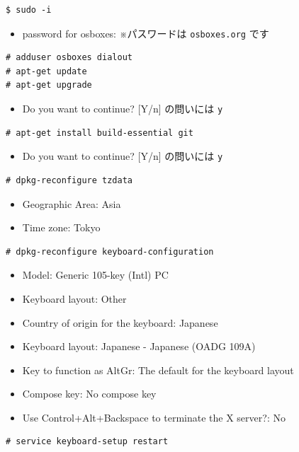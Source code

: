 \documentclass[a4j,oneside]{ujbook}
\begin{document}
\begin{verbatim}
$ sudo -i
\end{verbatim}
\begin{itemize}
 \renewcommand{\labelitemi}{$\triangleright$}
 \item password for osboxes: ※パスワードは \verb+osboxes.org+ です
\end{itemize}
\begin{verbatim}
# adduser osboxes dialout
# apt-get update
# apt-get upgrade
\end{verbatim}
\begin{itemize}
 \renewcommand{\labelitemi}{$\triangleright$}
 \item Do you want to continue? [Y/n] の問いには \verb+y+
\end{itemize}
\begin{verbatim}
# apt-get install build-essential git
\end{verbatim}
\begin{itemize}
 \renewcommand{\labelitemi}{$\triangleright$}
 \item Do you want to continue? [Y/n] の問いには \verb+y+
\end{itemize}
\begin{verbatim}
# dpkg-reconfigure tzdata
\end{verbatim}
\begin{itemize}
 \renewcommand{\labelitemi}{$\triangleright$}
 \item Geographic Area: Asia
 \item Time zone: Tokyo
\end{itemize}
\begin{verbatim}
# dpkg-reconfigure keyboard-configuration
\end{verbatim}
\begin{itemize}
 \renewcommand{\labelitemi}{$\triangleright$}
 \item Model: Generic 105-key (Intl) PC
 \item Keyboard layout: Other
 \item Country of origin for the keyboard: Japanese
 \item Keyboard layout: Japanese - Japanese (OADG 109A)
 \item Key to function as AltGr: The default for the keyboard layout
 \item Compose key: No compose key
 \item Use Control+Alt+Backspace to terminate the X server?: No
\end{itemize}
\begin{verbatim}
# service keyboard-setup restart
\end{verbatim}
\end{document}
